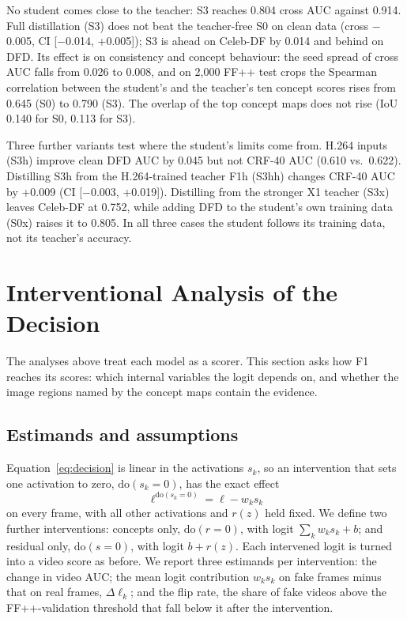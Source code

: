 \documentclass[conference]{IEEEtran}
\begin{document}
No student comes close to the teacher: S3 reaches 0.804 cross AUC against 0.914. Full distillation (S3) does not
beat the teacher-free S0 on clean data (cross $-$0.005, CI [$-$0.014, +0.005]); S3 is ahead on Celeb-DF by 0.014
and behind on DFD. Its effect is on consistency and concept behaviour: the seed spread of cross AUC falls from 0.026
to 0.008, and on 2,000 FF++ test crops the Spearman correlation between the student's and the teacher's ten concept
scores rises from 0.645 (S0) to 0.790 (S3). The overlap of the top concept maps does not rise (IoU 0.140 for S0,
0.113 for S3).

Three further variants test where the student's limits come from. H.264 inputs (S3h) improve clean DFD AUC by
0.045 but not CRF-40 AUC (0.610 vs.\ 0.622). Distilling S3h from the H.264-trained teacher F1h (S3hh) changes CRF-40
AUC by +0.009 (CI [$-$0.003, +0.019]). Distilling from the stronger X1 teacher (S3x) leaves Celeb-DF at 0.752, while
adding DFD to the student's own training data (S0x) raises it to 0.805. In all three cases the student follows its
training data, not its teacher's accuracy.

\section{Interventional Analysis of the Decision}\label{sec:interv}

The analyses above treat each model as a scorer. This section asks how F1 reaches its scores: which internal
variables the logit depends on, and whether the image regions named by the concept maps contain the evidence.

\subsection{Estimands and assumptions}
Equation~\eqref{eq:decision} is linear in the activations $s_k$, so an intervention that sets one activation to
zero, $\mathrm{do}(s_k=0)$, has the exact effect
\begin{equation}
\ell^{\mathrm{do}(s_k=0)} = \ell - w_k s_k
\label{eq:do}
\end{equation}
on every frame, with all other activations and $r(z)$ held fixed. We define two further interventions: concepts only,
$\mathrm{do}(r=0)$, with logit $\sum_k w_k s_k + b$; and residual only, $\mathrm{do}(s=0)$, with logit $b+r(z)$. Each
intervened logit is turned into a video score as before. We report three estimands per intervention: the change in
video AUC; the mean logit contribution $w_k s_k$ on fake frames minus that on real frames, $\Delta\ell_k$; and the
flip rate, the share of fake videos above the FF++-validation threshold that fall below it after the intervention.
\end{document}

